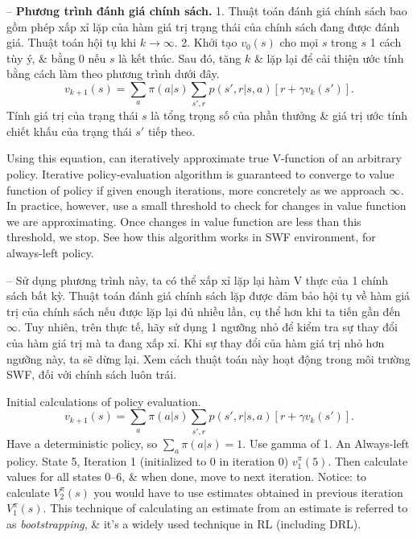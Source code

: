 \documentclass{article}
\begin{document}
\begin{itemize}
\begin{itemize}
\begin{itemize}
            -- {\bf Phương trình đánh giá chính sách.} 1. Thuật toán đánh giá chính sách bao gồm phép xấp xỉ lặp của hàm giá trị trạng thái của chính sách đang được đánh giá. Thuật toán hội tụ khi $k\to\infty$. 2. Khởi tạo $v_0(s)$ cho mọi $s$ trong $s$ 1 cách tùy ý, \& bằng 0 nếu $s$ là kết thúc. Sau đó, tăng $k$ \& lặp lại để cải thiện ước tính bằng cách làm theo phương trình dưới đây.
            \begin{equation*}
                v_{k+1}(s) = \sum_a \pi(a|s)\sum_{s',r} p(s',r|s,a)[r + \gamma v_k(s')].
            \end{equation*}
            Tính giá trị của trạng thái $s$ là tổng trọng số của phần thưởng \& giá trị ước tính chiết khấu của trạng thái $s'$ tiếp theo.

            Using this equation, can iteratively approximate true V-function of an arbitrary policy. Iterative policy-evaluation algorithm is guaranteed to converge to value function of policy if given enough iterations, more concretely as we approach $\infty$. In practice, however, use a small threshold to check for changes in value function we are approximating. Once changes in value function are less than this threshold, we stop. See how this algorithm works in SWF environment, for always-left policy.

            -- Sử dụng phương trình này, ta có thể xấp xỉ lặp lại hàm V thực của 1 chính sách bất kỳ. Thuật toán đánh giá chính sách lặp được đảm bảo hội tụ về hàm giá trị của chính sách nếu được lặp lại đủ nhiều lần, cụ thể hơn khi ta tiến gần đến $\infty$. Tuy nhiên, trên thực tế, hãy sử dụng 1 ngưỡng nhỏ để kiểm tra sự thay đổi của hàm giá trị mà ta đang xấp xỉ. Khi sự thay đổi của hàm giá trị nhỏ hơn ngưỡng này, ta sẽ dừng lại. Xem cách thuật toán này hoạt động trong môi trường SWF, đối với chính sách luôn trái.

            {\sf Initial calculations of policy evaluation.}
            \begin{equation*}
                v_{k+1}(s) = \sum_a \pi(a|s)\sum_{s',r} p(s',r|s,a)[r + \gamma v_k(s')].
            \end{equation*}
            Have a deterministic policy, so $\sum_a \pi(a|s) = 1$. Use gamma of 1. An Always-left policy. State 5, Iteration 1 (initialized to 0 in iteration 0) $v_1^\pi(5)$. Then calculate values for all states 0--6, \& when done, move to next iteration. Notice: to calculate $V_2^\pi(s)$ you would have to use estimates obtained in previous iteration $V_1^\pi(s)$. This technique of calculating an estimate from an estimate is referred to as {\it bootstrapping}, \& it's a widely used technique in RL (including DRL).


\end{itemize}
\end{itemize}
\end{itemize}
\end{document}
